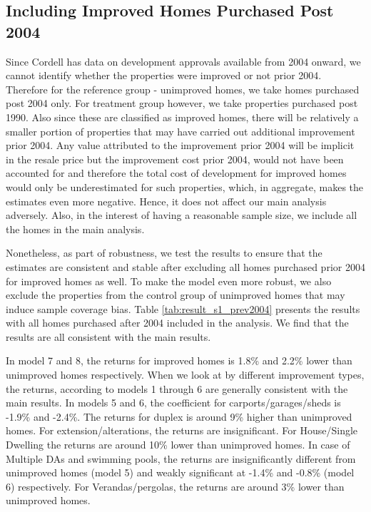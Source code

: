 \documentclass[AEJ,reqno, draftmode]{AEA} %
\begin{document}

\restoregeometry


\subsection{Including Improved Homes Purchased Post 2004}

Since Cordell has data on development approvals available from 2004 onward, we cannot identify whether the properties were improved or not prior 2004. Therefore for the reference group - unimproved homes, we take homes purchased post 2004 only. For treatment group however, we take properties purchased post 1990. Also since these are classified as improved homes, there will be relatively a smaller portion of properties that may have carried out additional improvement prior 2004. Any value attributed to the improvement prior 2004 will be implicit in the resale price but the improvement cost prior 2004, would not have been accounted for and therefore the total cost of development for improved homes would only be underestimated for such properties, which, in aggregate, makes the estimates even more negative. Hence, it does not affect our main analysis adversely. Also, in the interest of having a reasonable sample size, we include all the homes  in the main analysis.

Nonetheless, as part of robustness, we test the results to ensure that the estimates are consistent and stable after excluding all homes purchased prior 2004 for improved homes as well. To make the model even more robust, we also exclude the properties from the control group of unimproved homes that may induce sample coverage bias. Table \ref{tab:result_s1_prev2004} presents the results with all homes purchased after 2004 included in the analysis. We find that the results are all consistent with the main results. 

In model 7 and 8, the returns for improved homes is 1.8\% and 2.2\% lower than unimproved homes respectively. When we look at by different improvement types, the returns, according to models 1 through 6 are generally consistent with the main results. In models 5 and 6, the coefficient for carports/garages/sheds is -1.9\% and -2.4\%. The returns for duplex is around 9\% higher than unimproved homes. For extension/alterations, the returns are insignificant. For House/Single Dwelling the returns are around 10\% lower than unimproved homes. In case of Multiple DAs and swimming pools, the returns are insignificantly different from unimproved homes (model 5) and weakly significant at -1.4\% and -0.8\% (model 6) respectively. For Verandas/pergolas, the returns are around 3\% lower than unimproved homes.
\end{document}
